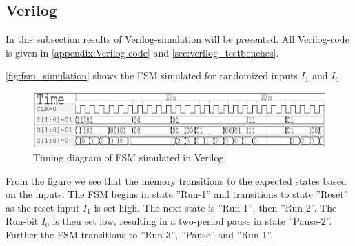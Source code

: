 \begin{table}[H]
\centering
\caption{Static Power Consumption}
\label{tab:power}
\end{table}

\subsection{Verilog}

In this subsection results of Verilog-simulation will be presented. All Verilog-code is given in \autoref{appendix:Verilog-code} and \ref{sec:verilog_testbenches}.

\autoref{fig:fsm_simulation} shows the FSM simulated for randomized inputs $I_1$ and $I_0$.

\begin{figure}[H]
    \centering
    \includegraphics[width=\textwidth]{Figures/FSM_testbench_out.png}
    \caption{Timing diagram of FSM simulated in Verilog}
    \label{fig:fsm_simulation}
\end{figure}

From the figure we see that the memory transitions to the expected states based on the inputs. The FSM begins in state ''Run-1'' and transitions to state ''Reset'' as the reset input $I_1$ is set high. The next state is ''Run-1'', then ''Run-2''. The Run-bit $I_0$ is then set low, resulting in a two-period pause in state ''Pause-2''. Further the FSM transitions to ''Run-3'', ''Pause'' and ''Run-1''.

